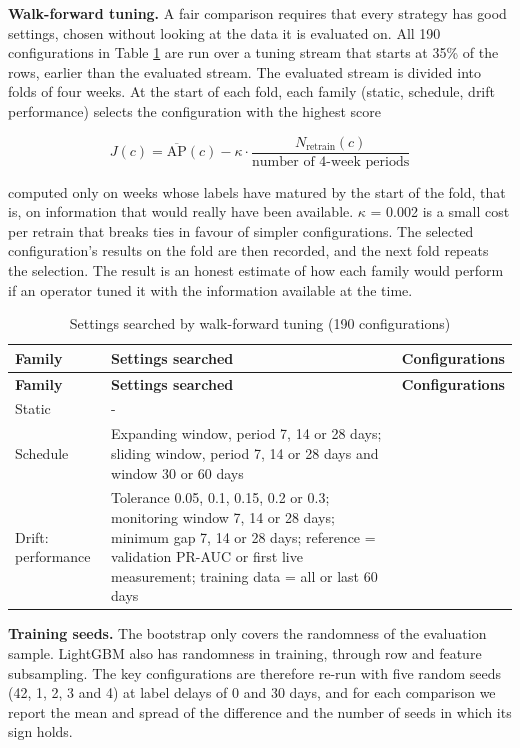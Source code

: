 \textbf{Walk-forward tuning.} A fair comparison requires that every strategy has good settings, chosen without looking at the data it is evaluated on. All 190 configurations in Table \ref{tab:grid} are run over a tuning stream that starts at 35\% of the rows, earlier than the evaluated stream. The evaluated stream is divided into folds of four weeks. At the start of each fold, each family (static, schedule, drift performance) selects the configuration with the highest score

\begin{equation}
  J(c) = \overline{\mathrm{AP}}(c) - \kappa \cdot \frac{N_{\mathrm{retrain}}(c)}{\text{number of 4-week periods}}
  \label{eq:objective}
\end{equation}

computed only on weeks whose labels have matured by the start of the fold, that is, on information that would really have been available. $\kappa$ = 0.002 is a small cost per retrain that breaks ties in favour of simpler configurations. The selected configuration's results on the fold are then recorded, and the next fold repeats the selection. The result is an honest estimate of how each family would perform if an operator tuned it with the information available at the time.

{\footnotesize
\begin{longtable}{>{\raggedright\arraybackslash}p{}>{\raggedright\arraybackslash}p{}>{\raggedright\arraybackslash}p{}}
\caption{Settings searched by walk-forward tuning (190 configurations)}\label{tab:grid}\\
\toprule
\textbf{Family} & \textbf{Settings searched} & \textbf{Configurations} \\
\midrule
\endfirsthead
\toprule
\textbf{Family} & \textbf{Settings searched} & \textbf{Configurations} \\
\midrule
\endhead
Static & - & 1 \\ \midrule
Schedule & Expanding window, period 7, 14 or 28 days; sliding window, period 7, 14 or 28 days and window 30 or 60 days & 9 \\ \midrule
Drift: performance & Tolerance 0.05, 0.1, 0.15, 0.2 or 0.3; monitoring window 7, 14 or 28 days; minimum gap 7, 14 or 28 days; reference = validation PR-AUC or first live measurement; training data = all or last 60 days & 180 \\ \bottomrule
\end{longtable}
}

\textbf{Training seeds.} The bootstrap only covers the randomness of the evaluation sample. LightGBM also has randomness in training, through row and feature subsampling. The key configurations are therefore re-run with five random seeds (42, 1, 2, 3 and 4) at label delays of 0 and 30 days, and for each comparison we report the mean and spread of the difference and the number of seeds in which its sign holds.

